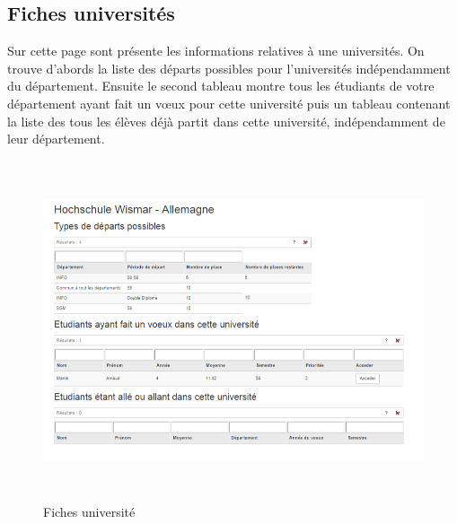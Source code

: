  \subsection{Fiches universités}
 \label{fu}
 Sur cette page sont présente les informations relatives à une universités. On trouve d'abords la liste des départs possibles pour l'universités indépendamment du département. Ensuite le second tableau montre tous les étudiants de votre département ayant fait un vœux pour cette université puis un tableau contenant la liste des tous les élèves déjà partit dans cette université, indépendamment de leur département.
   \begin{figure}[H]
      	\centering
       \includegraphics[width=16cm,height=10cm]{Images/Admin/fiche_univ_admin.png}
       \caption{Fiches université}
       
  \end{figure}
  
